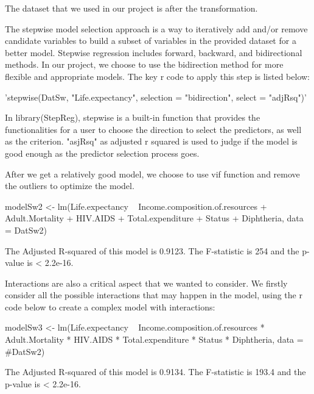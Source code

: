 The dataset that we used in our project is after the transformation.


The stepwise model selection approach is a way to iteratively add and/or remove candidate variables to build a subset of variables in the provided dataset for a better model. Stepwise regression includes forward, backward, and bidirectional methods. In our project, we choose to use the bidirection method for more flexible and appropriate models. The key r code to apply this step is listed below:

'stepwise(DatSw, "Life.expectancy", selection = "bidirection", select = "adjRsq")'

In library(StepReg), stepwise is a built-in function that provides the functionalities for a user to choose the direction to select the predictors, as well as the criterion. "asjRsq" as adjusted r squared is used to judge if the model is good enough as the predictor selection process goes.


After we get a relatively good model, we choose to use vif function and remove the outliers to optimize the model.

modelSw2 <- lm(Life.expectancy ~ Income.composition.of.resources + Adult.Mortality + HIV.AIDS + Total.expenditure + Status + Diphtheria, data = DatSw2)

The Adjusted R-squared of this model is 0.9123. The F-statistic is 254 and the p-value is < 2.2e-16.


Interactions are also a critical aspect that we wanted to consider. We firstly consider all the possible interactions that may happen in the model, using the r code below to create a complex model with interactions:

modelSw3 <- lm(Life.expectancy ~ Income.composition.of.resources * Adult.Mortality * HIV.AIDS * Total.expenditure * Status * Diphtheria, data = #DatSw2)

The Adjusted R-squared of this model is 0.9134. The F-statistic is 193.4 and the p-value is < 2.2e-16.

